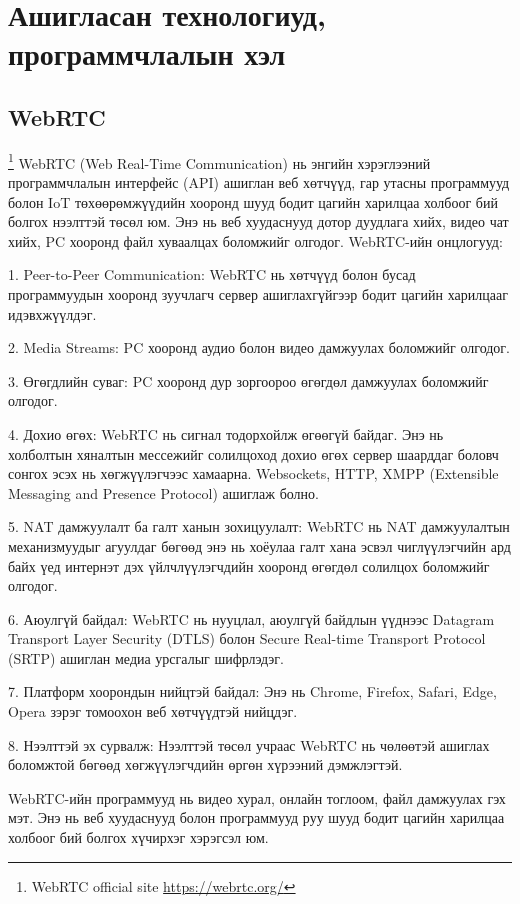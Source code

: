 \section{Ашигласан технологиуд, программчлалын хэл}
\subsection{WebRTC}
\footnote{WebRTC official site \url{https://webrtc.org/}}
	\quad \quad WebRTC (Web Real-Time Communication) нь энгийн хэрэглээний программчлалын интерфейс (API) ашиглан веб хөтчүүд, гар утасны программууд болон IoT төхөөрөмжүүдийн хооронд шууд бодит цагийн харилцаа холбоог бий болгох нээлттэй төсөл юм. Энэ нь веб хуудаснууд дотор дуудлага хийх, видео чат хийх, PC хооронд файл хуваалцах боломжийг олгодог. WebRTC-ийн онцлогууд:

	1. Peer-to-Peer Communication: WebRTC нь хөтчүүд болон бусад программуудын хооронд зуучлагч сервер ашиглахгүйгээр бодит цагийн харилцааг идэвхжүүлдэг.
	
	2. Media Streams: PC хооронд аудио болон видео дамжуулах боломжийг олгодог.
	
	3. Өгөгдлийн суваг: PC хооронд дур зоргоороо өгөгдөл дамжуулах боломжийг олгодог.
	
	4. Дохио өгөх: WebRTC нь сигнал тодорхойлж өгөөгүй байдаг. Энэ нь холболтын хяналтын мессежийг солилцоход дохио өгөх сервер шаарддаг боловч сонгох  эсэх нь хөгжүүлэгчээс хамаарна. Websockets, HTTP, XMPP (Extensible Messaging and Presence Protocol) ашиглаж болно.
	
	5. NAT дамжуулалт ба галт ханын зохицуулалт: WebRTC нь NAT дамжуулалтын механизмуудыг агуулдаг бөгөөд энэ нь хоёулаа галт хана эсвэл чиглүүлэгчийн ард байх үед интернэт  дэх үйлчлүүлэгчдийн хооронд өгөгдөл солилцох боломжийг олгодог.
	
	6. Аюулгүй байдал: WebRTC нь нууцлал, аюулгүй байдлын үүднээс Datagram Transport Layer Security (DTLS) болон Secure Real-time Transport Protocol (SRTP) ашиглан медиа урсгалыг шифрлэдэг.
	
	7. Платформ хоорондын нийцтэй байдал: Энэ нь Chrome, Firefox, Safari, Edge, Opera зэрэг томоохон веб хөтчүүдтэй нийцдэг.
	
	8. Нээлттэй эх сурвалж: Нээлттэй төсөл учраас WebRTC нь чөлөөтэй ашиглах боломжтой бөгөөд хөгжүүлэгчдийн өргөн хүрээний дэмжлэгтэй.
	
	WebRTC-ийн программууд нь видео хурал, онлайн тоглоом, файл дамжуулах гэх мэт. Энэ нь веб хуудаснууд болон программууд руу шууд бодит цагийн харилцаа холбоог бий болгох хүчирхэг хэрэгсэл юм.
	\pagebreak
